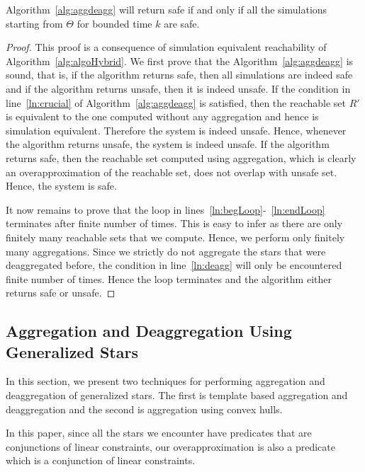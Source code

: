 \begin{lemma}
Algorithm~\ref{alg:aggdeagg} will return safe if and only if all the simulations starting from $\Theta$ for bounded time $k$ are safe.
\end{lemma}
\begin{proof}
This proof is a consequence of simulation equivalent reachability of Algorithm~\ref{alg:algoHybrid}. We first prove that the Algorithm~\ref{alg:aggdeagg} is sound, that is, if the algorithm returns safe, then all simulations are indeed safe and if the algorithm returns unsafe, then it is indeed unsafe. If the condition in line~\ref{ln:crucial} of Algorithm~\ref{alg:aggdeagg} is satisfied, then the reachable set $R'$ is equivalent to the one computed without any aggregation and hence is simulation equivalent. Therefore the system is indeed unsafe. Hence, whenever the algorithm returns unsafe, the system is indeed unsafe. If the algorithm returns safe, then the reachable set computed using aggregation, which is clearly an overapproximation of the reachable set, does not overlap with unsafe set. Hence, the system is safe. 

It now remains to prove that the loop in lines~\ref{ln:begLoop}-~\ref{ln:endLoop} terminates after finite number of times. This is easy to infer as there are only finitely many reachable sets that we compute. Hence, we perform only finitely many aggregations. Since we strictly do not aggregate the stars that were deaggregated before, the condition in line~\ref{ln:deagg} will only be encountered finite number of times. Hence the loop terminates and the algorithm either returns safe or unsafe.
\end{proof}

\vspace{-0.3cm}
\subsection{Aggregation and Deaggregation Using Generalized Stars}
\label{sec:aggStars}
\vspace{-0.1cm}

In this section, we present two techniques for performing aggregation and deaggregation of generalized stars. The first is template based aggregation and deaggregation and the second is aggregation using convex hulls.
%


In this paper, since all the stars we encounter have predicates that are conjunctions of linear constraints, our overapproximation is also a predicate which is a conjunction of linear constraints.

